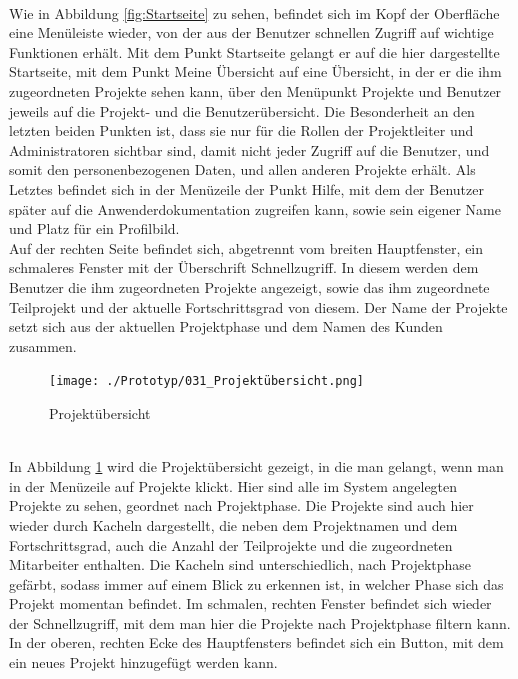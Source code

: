 \\Wie in Abbildung \ref{fig:Startseite} zu sehen, befindet sich im Kopf der Oberfläche eine Menüleiste wieder, von der aus der Benutzer schnellen Zugriff auf wichtige Funktionen erhält. Mit dem Punkt \glqq{}Startseite\grqq{} gelangt er auf die hier dargestellte Startseite, mit dem Punkt \glqq{}Meine Übersicht\grqq{} auf eine Übersicht, in der er die ihm zugeordneten Projekte sehen kann, über den Menüpunkt \glqq{}Projekte\grqq{} und \glqq{}Benutzer\grqq{} jeweils auf die Projekt- und die Benutzerübersicht. Die Besonderheit an den letzten beiden Punkten ist, dass sie nur für die Rollen der Projektleiter und Administratoren sichtbar sind, damit nicht jeder Zugriff auf die Benutzer, und somit den personenbezogenen Daten, und allen anderen Projekte erhält. Als Letztes befindet sich in der Menüzeile der Punkt \glqq{}Hilfe\grqq{}, mit dem der Benutzer später auf die Anwenderdokumentation zugreifen kann, sowie sein eigener Name und Platz für ein Profilbild.\\Auf der rechten Seite befindet sich, abgetrennt vom breiten Hauptfenster, ein schmaleres Fenster mit der Überschrift Schnellzugriff. In diesem werden dem Benutzer die ihm zugeordneten Projekte angezeigt, sowie das ihm zugeordnete Teilprojekt und der aktuelle Fortschrittsgrad von diesem. Der Name der Projekte setzt sich aus der aktuellen Projektphase und dem Namen des Kunden zusammen.
\begin{figure}[h!]
    \centering
    \texttt{[image: ./Prototyp/031\_Projektübersicht.png]}
    \caption[Prototyp: Projektübersicht]{Projektübersicht}
    \label{fig:Projektübersicht}
\end{figure}
\\In Abbildung \ref{fig:Projektübersicht} wird die Projektübersicht gezeigt, in die man gelangt, wenn man in der Menüzeile auf \glqq{}Projekte\grqq{} klickt. Hier sind alle im System angelegten Projekte zu sehen, geordnet nach Projektphase. Die Projekte sind auch hier wieder durch Kacheln dargestellt, die neben dem Projektnamen und dem Fortschrittsgrad, auch die Anzahl der Teilprojekte und die zugeordneten Mitarbeiter enthalten. Die Kacheln sind unterschiedlich, nach Projektphase gefärbt, sodass immer auf einem Blick zu erkennen ist, in welcher Phase sich das Projekt momentan befindet. Im schmalen, rechten Fenster befindet sich wieder der Schnellzugriff, mit dem man hier die Projekte nach Projektphase filtern kann. In der oberen, rechten Ecke des Hauptfensters befindet sich ein Button, mit dem ein neues Projekt hinzugefügt werden kann.

